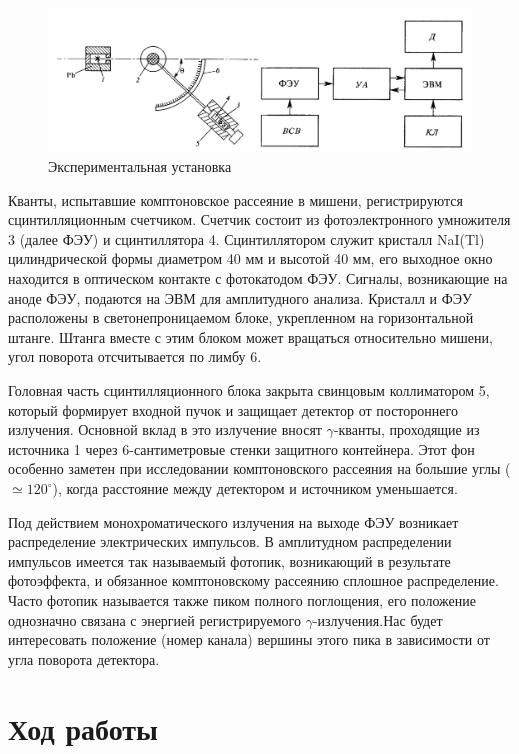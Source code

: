 \documentclass[12pt,a4paper]{article}
\begin{document}
 	\begin{figure}[h!]
 		\centering
 		\includegraphics[width=\linewidth]{res/scheme.png}
 		\caption{Экспериментальная установка}
 		\label{Scheme_Compton}
 	\end{figure}
 
 	Кванты, испытавшие комптоновское рассеяние в мишени, регистрируются сцинтилляционным счетчиком. Счетчик состоит из фотоэлектронного умножителя 3 (далее ФЭУ) и сцинтиллятора 4. Сцинтиллятором служит
 	кристалл NaI(Tl) цилиндрической формы диаметром 40 мм и высотой 40 мм, его выходное окно находится в оптическом контакте с фотокатодом ФЭУ. Сигналы, возникающие на аноде ФЭУ, подаются на ЭВМ для амплитудного анализа. Кристалл и ФЭУ расположены в светонепроницаемом блоке, укрепленном на горизонтальной штанге. Штанга вместе с этим блоком может вращаться относительно мишени, угол поворота отсчитывается по лимбу 6.
 	
 	Головная часть сцинтилляционного блока закрыта свинцовым коллиматором 5, который формирует входной пучок и защищает детектор от постороннего излучения. Основной вклад в это излучение вносят $\gamma$-кванты, проходящие из источника 1 через 6-сантиметровые стенки защитного контейнера. Этот фон особенно заметен при исследовании комптоновского рассеяния на большие углы ($\simeq 120^\circ$), когда расстояние между детектором и источником уменьшается.
 	
 	
 	Под действием монохроматического излучения на выходе ФЭУ возникает распределение электрических импульсов. В амплитудном распределении импульсов имеется так называемый фотопик, возникающий в результате фотоэффекта, и обязанное комптоновскому рассеянию сплошное распределение. Часто фотопик называется также пиком полного поглощения, его положение однозначно связана с энергией регистрируемого $\gamma$-излучения.Нас будет интересовать положение (номер канала) вершины этого пика в зависимости от угла поворота детектора.

 
    \section*{Ход работы}
\end{document}
